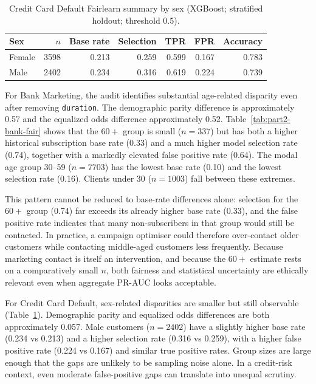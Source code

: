 \documentclass[11pt,a4paper]{article}
\begin{document}
\begin{table}[htbp]
\centering
\caption{Credit Card Default Fairlearn summary by sex (XGBoost; stratified holdout;
threshold 0.5).}
\label{tab:part2-credit-fair}
\small
\begin{tabular}{lrrrrrr}
\toprule
Sex & $n$ & Base rate & Selection & TPR & FPR & Accuracy \\
\midrule
Female & 3598 & 0.213 & 0.259 & 0.599 & 0.167 & 0.783 \\
Male   & 2402 & 0.234 & 0.316 & 0.619 & 0.224 & 0.739 \\
\bottomrule
\end{tabular}
\end{table}

For Bank Marketing, the audit identifies substantial age-related disparity even after
removing \texttt{duration}. The demographic parity difference is approximately 0.57
and the equalized odds difference approximately 0.52. Table~\ref{tab:part2-bank-fair}
shows that the $60+$ group is small ($n=337$) but has both a higher historical
subscription base rate (0.33) and a much higher model selection rate (0.74), together
with a markedly elevated false positive rate (0.64). The modal age group 30--59
($n=7703$) has the lowest base rate (0.10) and the lowest selection rate (0.16).
Clients under 30 ($n=1003$) fall between these extremes.

This pattern cannot be reduced to base-rate differences alone: selection for the $60+$
group (0.74) far exceeds its already higher base rate (0.33), and the false positive
rate indicates that many non-subscribers in that group would still be contacted. In
practice, a campaign optimiser could therefore over-contact older customers while
contacting middle-aged customers less frequently. Because marketing contact is itself
an intervention, and because the $60+$ estimate rests on a comparatively small $n$,
both fairness and statistical uncertainty are ethically relevant even when aggregate
PR-AUC looks acceptable.

For Credit Card Default, sex-related disparities are smaller but still observable
(Table~\ref{tab:part2-credit-fair}). Demographic parity and equalized odds differences
are both approximately 0.057. Male customers ($n=2402$) have a slightly higher base
rate (0.234 vs 0.213) and a higher selection rate (0.316 vs 0.259), with a higher
false positive rate (0.224 vs 0.167) and similar true positive rates. Group sizes are
large enough that the gaps are unlikely to be sampling noise alone. In a credit-risk
context, even moderate false-positive gaps can translate into unequal scrutiny.
\end{document}
